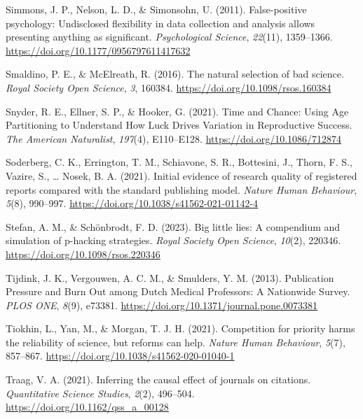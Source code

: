 \documentclass[
  ,man,mask,floatsintext]{apa6}
\newlength{\cslhangindent}
\newlength{\cslentryspacingunit} %
\newenvironment{CSLReferences}[2] %
 {%
  \setlength{\parindent}{0pt}
  \ifodd #1
  \let\oldpar\par
  \def\par{\hangindent=\cslhangindent\oldpar}
  \fi
  \setlength{\parskip}{#2\cslentryspacingunit}
 }%
 {}
\begin{document}
\begin{CSLReferences}{1}{0}
\leavevmode{}%
Simmons, J. P., Nelson, L. D., \& Simonsohn, U. (2011). False-positive psychology: {Undisclosed} flexibility in data collection and analysis allows presenting anything as significant. \emph{Psychological Science}, \emph{22}(11), 1359--1366. \url{https://doi.org/10.1177/0956797611417632}

\leavevmode{}%
Smaldino, P. E., \& McElreath, R. (2016). The natural selection of bad science. \emph{Royal Society Open Science}, \emph{3}, 160384. \url{https://doi.org/10.1098/rsos.160384}

\leavevmode{}%
Snyder, R. E., Ellner, S. P., \& Hooker, G. (2021). Time and {Chance}: {Using Age Partitioning} to {Understand How Luck Drives Variation} in {Reproductive Success}. \emph{The American Naturalist}, \emph{197}(4), E110--E128. \url{https://doi.org/10.1086/712874}

\leavevmode{}%
Soderberg, C. K., Errington, T. M., Schiavone, S. R., Bottesini, J., Thorn, F. S., Vazire, S., \ldots{} Nosek, B. A. (2021). Initial evidence of research quality of registered reports compared with the standard publishing model. \emph{Nature Human Behaviour}, \emph{5}(8), 990--997. \url{https://doi.org/10.1038/s41562-021-01142-4}

\leavevmode{}%
Stefan, A. M., \& Schönbrodt, F. D. (2023). Big little lies: A compendium and simulation of p-hacking strategies. \emph{Royal Society Open Science}, \emph{10}(2), 220346. \url{https://doi.org/10.1098/rsos.220346}

\leavevmode{}%
Tijdink, J. K., Vergouwen, A. C. M., \& Smulders, Y. M. (2013). Publication {Pressure} and {Burn Out} among {Dutch Medical Professors}: {A Nationwide Survey}. \emph{PLOS ONE}, \emph{8}(9), e73381. \url{https://doi.org/10.1371/journal.pone.0073381}

\leavevmode{}%
Tiokhin, L., Yan, M., \& Morgan, T. J. H. (2021). Competition for priority harms the reliability of science, but reforms can help. \emph{Nature Human Behaviour}, \emph{5}(7), 857--867. \url{https://doi.org/10.1038/s41562-020-01040-1}

\leavevmode{}%
Traag, V. A. (2021). Inferring the causal effect of journals on citations. \emph{Quantitative Science Studies}, \emph{2}(2), 496--504. \url{https://doi.org/10.1162/qss_a_00128}


\end{CSLReferences}
\end{document}
